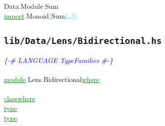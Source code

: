 {\rm{}Data}\textcolor{cyan}{.}{\rm{}Module}\textcolor{cyan}{.}{\rm{}Sum}\\\textcolor{green}{\underline{import}}\textcolor{cyan}{.}{\rm{}Monoid}\hsspace \textcolor{cyan}{(}{\rm{}Sum}\textcolor{cyan}{(}\textcolor{red}{..}\textcolor{cyan}{)}\textcolor{cyan}{)}\\
\subsection{\texttt{lib/Data/Lens/Bidirectional.hs}}
\label{mod:Data.Lens.Bidirectional}
\textcolor{blue}{{\it{}\{-\# LANGUAGE TypeFamilies \#-\}}}\\\\\textcolor{green}{\underline{module}}\textcolor{cyan}{.}{\rm{}Lens}\textcolor{cyan}{.}{\rm{}Bidirectional}\hsspace \textcolor{green}{\underline{where}}\\\\\textcolor{green}{\underline{class}}\hsspace \textcolor{green}{\underline{where}}\\\hstab \textcolor{green}{\underline{type}}\\\hstab \textcolor{green}{\underline{type}}\\
